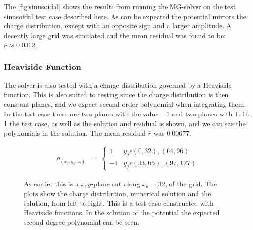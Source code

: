 	The \cref{fig:sinusoidal} shows the results from running the MG-solver on the test sinusoidal test case described here.
	As can be expected the potential mirrors the charge distribution, except with an opposite sign and a larger amplitude.
	A decently large grid was simulated and the mean residual was found to be: \(\bar{r} \approx 0.0312\).


	\subsubsection{Heaviside Function}
		The solver is also tested with a charge distribution governed by a Heaviside
		function. This is also suited to testing since the charge distribution is then
		constant planes, and we expect second order polynomial when integrating them.
		In the test case there are two planes with the value \(-1\) and two
		planes with \(1\). In \cref{fig:heaviside} the test case, as well as the solution and residual is
		shown, and we can see the polynomials in the solution. The mean residual \(\bar{r}\) was
		\(0.00677\).

	\begin{align}
		\rho_(x_j,y_k,z_l) &= \begin{cases} 1  & y_j \epsilon (0, 32), (64,96)\\ -1  & y_j \epsilon (33, 65), (97,127) \end{cases}
	\end{align}

	\begin{figure}
		\centering
		\caption{As earlier this is a \(x,y\)-plane cut along \(x_k=32\), of the grid. The plots show the charge distribution,
		numerical solution and the solution, from left to right. This is a test case constructed
		with Heaviside functions. In the solution of the potential the expected second degree polynomial can be seen.
		}
		\label{fig:heaviside}
	\end{figure}

